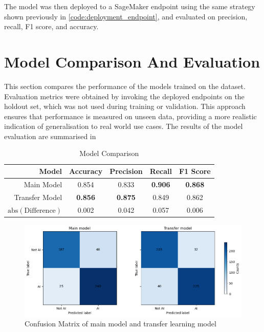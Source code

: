 The model was then deployed to a SageMaker endpoint using the same strategy shown previously in \cref{code:deployment_endpoint}, and evaluated on precision, recall, F1 score, and accuracy.

\newpage

\section{Model Comparison And Evaluation}

This section compares the performance of the models trained on the dataset. Evaluation metrics were obtained by invoking the deployed endpoints on the holdout set, which was not used during training or validation. This approach ensures that performance is measured on unseen data, providing a more realistic indication of generalisation to real world use cases. The results of the model evaluation are summarised in 


\begin{table}[h]
\centering
\caption{Model Comparison}
\begin{tabular}{rcccc}
\toprule
\textbf{Model} & \textbf{Accuracy} & \textbf{Precision} & \textbf{Recall} & \textbf{F1 Score} \\
\midrule
Main Model     & 0.854          & 0.833          & \textbf{0.906} & \textbf{0.868} \\
Transfer Model & \textbf{0.856} & \textbf{0.875} & 0.849 & 0.862 \\
\midrule
$\text{abs}(\text{Difference}) $ & 0.002 & 0.042 & 0.057 & 0.006 \\
\bottomrule
\end{tabular}
\label{tab:model_comparison}
\end{table}

\begin{figure}[h]
    \centering
    \includegraphics[width=0.8\linewidth]{figures/confusion_matrix.png} %
    \centering
    \caption{Confusion Matrix of main model and transfer learning model} %
    \label{fig:confusion_matrixes} %
\end{figure}

